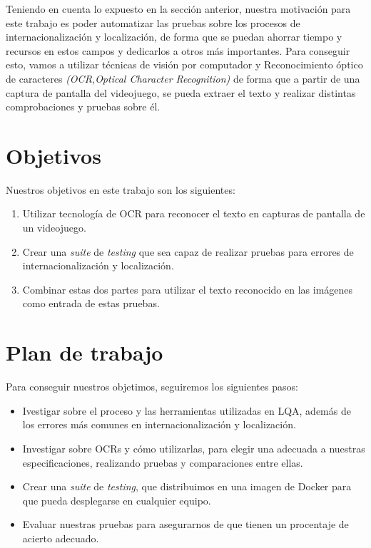 Teniendo en cuenta lo expuesto en la sección anterior, nuestra motivación para este trabajo es poder automatizar las pruebas sobre los procesos de internacionalización y localización, de forma que se puedan
ahorrar tiempo y recursos en estos campos y dedicarlos a otros más importantes. Para conseguir esto, vamos a utilizar técnicas de visión por computador y Reconocimiento óptico de caracteres \textit{(OCR,Optical Character Recognition)}
de forma que a partir de una captura de pantalla del videojuego, se pueda extraer el texto y realizar distintas comprobaciones y pruebas sobre él.


\section{Objetivos}
Nuestros objetivos en este trabajo son los siguientes:
\begin{enumerate}
	\item Utilizar tecnología de OCR para reconocer el texto en capturas de pantalla de un videojuego.
	\item Crear una \textit{suite} de \textit{testing} que sea capaz de realizar pruebas para errores de internacionalización y localización.
	\item Combinar estas dos partes para utilizar el texto reconocido en las imágenes como entrada de estas pruebas.
\end{enumerate}


\section{Plan de trabajo}
Para conseguir nuestros objetimos, seguiremos los siguientes pasos:
\begin{itemize}
	\item Ivestigar sobre el proceso y las herramientas utilizadas en LQA, además de los errores más comunes en internacionalización y localización.
	\item Investigar sobre OCRs y cómo utilizarlas, para elegir una adecuada a nuestras especificaciones, realizando pruebas y comparaciones entre ellas.
	\item Crear una \textit{suite} de \textit{testing}, que distribuimos en una imagen de Docker para que pueda desplegarse en cualquier equipo.
	\item Evaluar nuestras pruebas para asegurarnos de que tienen un procentaje de acierto adecuado.
\end{itemize}




